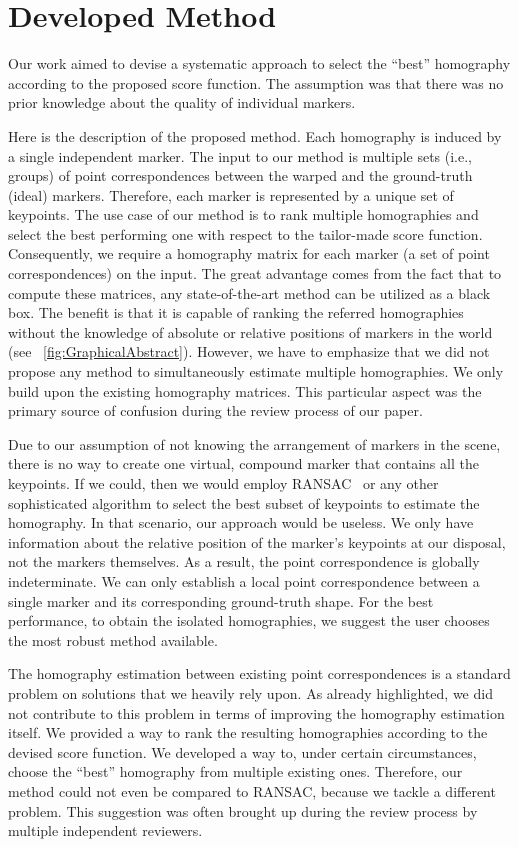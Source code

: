 \section{Developed Method}
\label{sec:HomographyDevelopedMethod}

Our work aimed to devise a systematic approach to select the ``best'' homography according to the proposed score function. The assumption was that there was no prior knowledge about the quality of individual markers.

Here is the description of the proposed method. Each homography is induced by a single independent marker. The input to our method is multiple sets (i.e., groups) of point correspondences between the warped and the ground-truth (ideal) markers. Therefore, each marker is represented by a unique set of keypoints. The use case of our method is to rank multiple homographies and select the best performing one with respect to the tailor-made score function. Consequently, we require a homography matrix for each marker (a set of point correspondences) on the input. The great advantage comes from the fact that to compute these matrices, any state-of-the-art method can be utilized as a black box. The benefit is that it is capable of ranking the referred homographies without the knowledge of absolute or relative positions of markers in the world (see \figstr{}~\ref{fig:GraphicalAbstract}). However, we have to emphasize that we did not propose any method to simultaneously estimate multiple homographies. We only build upon the existing homography matrices. This particular aspect was the primary source of confusion during the review process of our paper.

Due to our assumption of not knowing the arrangement of markers in the scene, there is no way to create one virtual, compound marker that contains all the keypoints. If we could, then we would employ RANSAC~\cite{fischler1981ransac} or any other sophisticated algorithm to select the best subset of keypoints to estimate the homography. In that scenario, our approach would be useless. We only have information about the relative position of the marker’s keypoints at our disposal, not the markers themselves. As a result, the point correspondence is globally indeterminate. We can only establish a local point correspondence between a single marker and its corresponding ground-truth shape. For the best performance, to obtain the isolated homographies, we suggest the user chooses the most robust method available.

The homography estimation between existing point correspondences is a standard problem on solutions that we heavily rely upon. As already highlighted, we did not contribute to this problem in terms of improving the homography estimation itself. We provided a way to rank the resulting homographies according to the devised score function. We developed a way to,
under certain circumstances, choose the ``best'' homography from multiple existing ones. Therefore, our method could not even be compared to RANSAC, because we tackle a different problem. This suggestion was often brought up during the review process by multiple independent reviewers.

